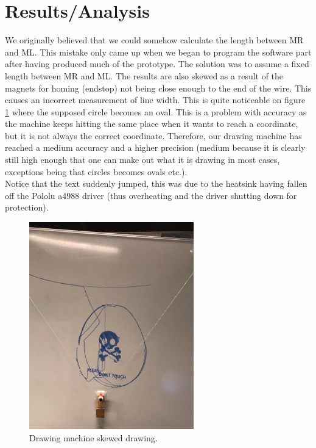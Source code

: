 
\section{Results/Analysis}
We originally believed that we could somehow calculate the length between MR and ML. This mistake only came up when we began to program the software part after having produced much of the prototype. The solution was to assume a fixed length between MR and ML. The results are also skewed as a result of the magnets for homing (endstop) not being close enough to the end of the wire. This causes an incorrect measurement of line width. This is quite noticeable on figure \ref{SkewedDrawing} where the supposed circle becomes an oval. This is a problem with accuracy as the machine keeps hitting the same place when it wants to reach a coordinate, but it is not always the correct coordinate. Therefore, our drawing machine has reached a medium accuracy and a higher precision (medium because it is clearly still high enough that one can make out what it is drawing in most cases, exceptions being that circles becomes ovals etc.).\\
Notice that the text suddenly jumped, this was due to the heatsink having fallen off the Pololu a4988 driver (thus overheating and the driver shutting down for protection).

\begin{figure}[h]
\centering
\includegraphics[scale=0.60]{Images/DrawingMachine/SkewedDrawing.jpg}
\caption{ Drawing machine skewed drawing. }
\label{SkewedDrawing}
\end{figure}